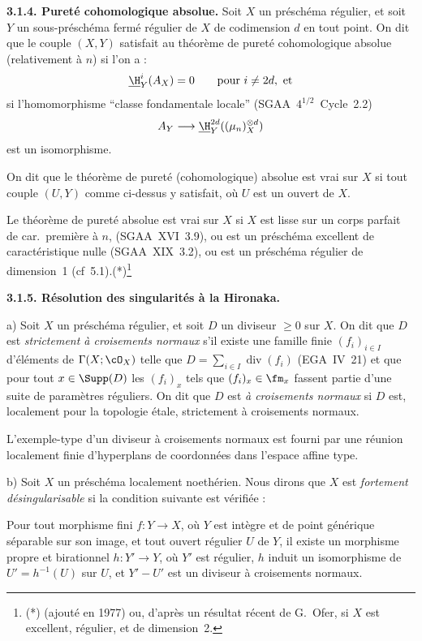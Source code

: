 \textbf{3.1.4. Pureté cohomologique absolue.} Soit $X$ un préschéma régulier, et soit $Y$ un sous-préschéma fermé régulier de $X$ de codimension $d$ en tout point. On dit que le couple $(X,Y)$ satisfait au théorème de pureté cohomologique absolue (relativement à $n$) si l'on a :
\[
\underline{\H}^i_Y(A_X) = 0 \qquad \text{pour } i \neq 2d, \text{ et}
\]
si l'homomorphisme ``classe fondamentale locale'' (SGAA~$4^{1/2}$~Cycle~2.2)
\[
A_Y \longrightarrow \underline{\H}^{2d}_Y((\mu_n)^{\otimes d}_X)
\]
est un isomorphisme.

On dit que le théorème de pureté (cohomologique) absolue est vrai sur $X$ si tout couple $(U,Y)$ comme ci-dessus y satisfait, où $U$ est un ouvert de $X$.

Le théorème de pureté absolue est vrai sur $X$ si $X$ est lisse sur un corps parfait de car.~première à $n$, (SGAA~XVI~3.9), ou est un préschéma excellent de caractéristique nulle (SGAA~XIX~3.2), ou est un préschéma régulier de dimension~1 (cf~5.1).(*)\footnote{(*) (ajouté en 1977) ou, d'après un résultat récent de G.~Ofer, si $X$ est excellent, régulier, et de dimension~2.}

\textbf{3.1.5. Résolution des singularités à la Hironaka.}

a) Soit $X$ un préschéma régulier, et soit $D$ un diviseur $\geqslant 0$ sur $X$. On dit que $D$ est \emph{strictement à croisements normaux} s'il existe une famille finie $(f_i)_{i \in I}$ d'éléments de $\Gamma(X; \cO_X)$ telle que $D = \sum_{i \in I} \operatorname{div}(f_i)$ (EGA~IV~21) et que pour tout $x \in \Supp(D)$ les $(f_i)_x$ tels que $(f_i)_x \in \fm_x$ fassent partie d'une suite de paramètres réguliers. On dit que $D$ est \emph{à croisements normaux} si $D$ est, localement pour la topologie étale, strictement à croisements normaux.

L'exemple-type d'un diviseur à croisements normaux est fourni par une réunion localement finie d'hyperplans de coordonnées dans l'espace affine type.

b) Soit $X$ un préschéma localement noethérien. Nous dirons que $X$ est \emph{fortement désingularisable} si la condition suivante est vérifiée :

Pour tout morphisme fini $f : Y \to X$, où $Y$ est intègre et de point générique séparable sur son image, et tout ouvert régulier $U$ de $Y$, il existe un morphisme propre et birationnel $h : Y' \to Y$, où $Y'$ est régulier, $h$ induit un isomorphisme de $U' = h^{-1}(U)$ sur $U$, et $Y' - U'$ est un diviseur à croisements normaux.


